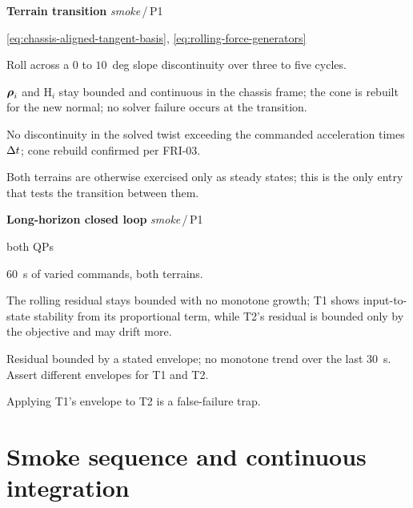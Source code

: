 \documentclass[10pt]{article}
\newenvironment{testcard}[4]{%
  \par\medskip\noindent
  \tBlock{#1}\quad\textbf{#2}%
  \hfill{\small\textit{#3}\,/\,#4}\par\nopagebreak\vspace{2pt}
  \begin{description}[leftmargin=7.5em,style=sameline,itemsep=1pt,topsep=1pt]
}{%
  \end{description}\par\medskip
}
\begin{document}
\begin{testcard}{SMK-12}{Terrain transition}{smoke}{P1}
  \item[Targets] \eqref{eq:chassis-aligned-tangent-basis},
    \eqref{eq:rolling-force-generators}
  \item[Regime] Roll across a $0$ to $10$~deg slope discontinuity over three to
    five cycles.
  \item[Invariant] $\boldsymbol{\rho}_i$ and $\text{H}_i$ stay bounded and continuous
    in the chassis frame; the cone is rebuilt for the new normal; no solver
    failure occurs at the transition.
  \item[Pass] No discontinuity in the solved twist exceeding the commanded
    acceleration times $\Delta t$; cone rebuild confirmed per FRI-03.
  \item[Diagnosis] Both terrains are otherwise exercised only as steady states;
    this is the only entry that tests the transition between them.
\end{testcard}

\begin{testcard}{SMK-13}{Long-horizon closed loop}{smoke}{P1}
  \item[Targets] both QPs
  \item[Regime] $60$~s of varied commands, both terrains.
  \item[Invariant] The rolling residual stays bounded with no monotone growth;
    T1 shows input-to-state stability from its proportional term, while T2's
    residual is bounded only by the objective and may drift more.
  \item[Pass] Residual bounded by a stated envelope; no monotone trend over the
    last $30$~s. Assert different envelopes for T1 and T2.
  \item[Diagnosis] Applying T1's envelope to T2 is a false-failure trap.
\end{testcard}

\section{Smoke sequence and continuous integration}
\label{sec:test-sequence}
\end{document}
